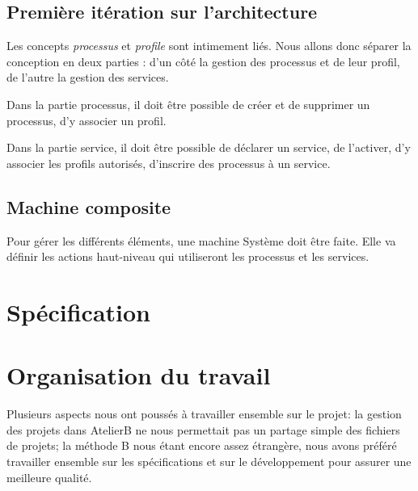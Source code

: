 \documentclass[french, 11pt, a4paper]{article}
\begin{document}
    \subsection{Première itération sur l'architecture}
        Les concepts \emph{processus} et \emph{profile} sont intimement liés.
        Nous allons donc séparer la conception en deux parties : d'un côté la
        gestion des processus et de leur profil, de l'autre la gestion des
        services.

        Dans la partie processus, il doit être possible de créer et de supprimer
        un processus, d'y associer un profil.

        Dans la partie service, il doit être possible de déclarer un service, de
        l'activer, d'y associer les profils autorisés, d'inscrire des processus à un service.

    \subsection{Machine composite}

        Pour gérer les différents éléments, une machine Système doit être faite.
        Elle va définir les actions haut-niveau qui utiliseront les processus et
        les services.


\section{Spécification}

    \subsection{}



\section{Organisation du travail}
    Plusieurs aspects nous ont poussés à travailler ensemble sur le projet: la
    gestion des projets dans AtelierB ne nous permettait pas un partage simple
    des fichiers de projets; la méthode B nous étant encore assez étrangère,
    nous avons préféré travailler ensemble sur les spécifications et sur le
    développement pour assurer une meilleure qualité.
\end{document}
